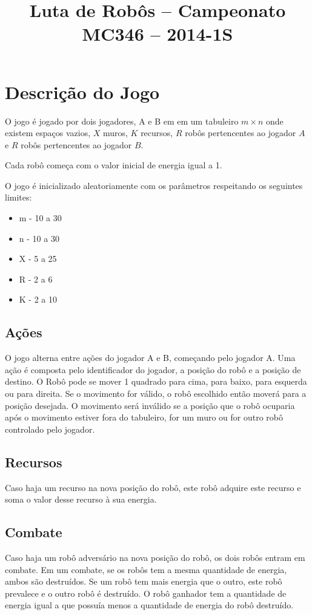 \documentclass[11pt]{article}
\title{\textbf{Luta de Robôs -- Campeonato MC346 -- 2014-1S}}
\date{}
\begin{document}
\maketitle

\section{Descrição do Jogo}

O jogo é jogado por dois jogadores, A e B em em um tabuleiro $m \times n$ onde existem espaços vazios, $X$ muros, $K$ recursos, $R$ robôs pertencentes ao jogador $A$ e $R$ robôs pertencentes ao jogador $B$.

Cada robô começa com o valor inicial de energia igual a 1.

O jogo é inicializado aleatoriamente com os parâmetros respeitando os seguintes limites:
\begin{itemize}
\item{m - 10 a 30}
\item{n - 10 a 30}
\item{X - 5 a 25}
\item{R - 2 a 6}
\item{K - 2 a 10}
\end{itemize}

\subsection{Ações}
O jogo alterna entre ações do jogador A e B, começando pelo jogador A. Uma ação é composta pelo identificador do jogador, a posição do robô e a posição de destino. O Robô pode se mover 1 quadrado para cima, para baixo, para esquerda ou para direita. Se o movimento for válido, o robô escolhido então moverá para a posição desejada. O movimento será inválido se a posição que o robô ocuparia após o movimento estiver fora do tabuleiro, for um muro ou for outro robô controlado pelo jogador.

\subsection{Recursos}
Caso haja um recurso na nova posição do robô, este robô adquire este recurso e soma o valor desse recurso à sua energia.

\subsection{Combate}
Caso haja um robô adversário na nova posição do robô, os dois robôs entram em combate. Em um combate, se os robôs tem a mesma quantidade de energia, ambos são destruídos. Se um robô tem mais energia que o outro, este robô prevalece e o outro robô é destruído. O robô ganhador tem a quantidade de energia igual a que possuía menos a quantidade de energia do robô destruído.
\end{document}
